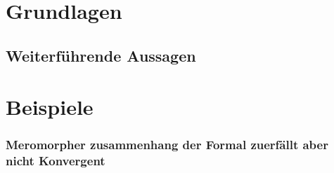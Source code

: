 \documentclass[ngerman
  ,numbers=noenddot %
  ,headsepline
  ,parskip=half*
  ,openany
  ,DIV=15
]{scrbook}
\numberwithin{equation}{chapter}
\numberwithin{figure}{chapter}
\theoremstyle{plain}%
\theoremstyle{definition}
\theoremstyle{remark}
\begin{document}

\frontmatter



\tableofcontents{}



\mainmatter

\part{Grundlagen}





\chapter{Weiterführende Aussagen}


\part{Beispiele}
\section{Meromorpher zusammenhang der Formal zuerfällt aber nicht Konvergent}

\appendix
{}



\nocite{*}
% 


\end{document}
